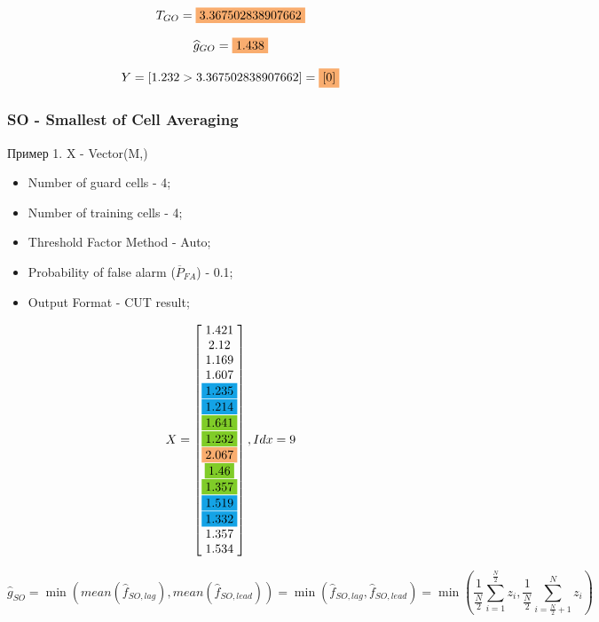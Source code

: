 \documentclass[a4paper,11pt]{article}
\begin{document}
			\begin{framed}
				
				$$ T_{GO} =  \colorbox{Apricot}{3.367502838907662}$$
				
				$$ \widehat{g}_{GO} =  \colorbox{Apricot}{1.438}$$ 
				
				$$ Y = [1.232 > 3.367502838907662] = \colorbox{Apricot}{[0]}$$
			\end{framed}
			
			
		\subsubsection{SO - Smallest of Cell Averaging}
			Пример 1. X - Vector(M,)
			
			\begin{itemize}
				\item Number of guard cells - 4; 
				\item Number of training cells - 4;
				\item Threshold Factor Method - Auto;
				\item Probability of false alarm ($\overline{P}_{FA}$) - 0.1;
				\item Output Format - CUT result;
			\end{itemize}
			
			$$X = 
			\begin{bmatrix}
				1.421\\
				2.12\\
				1.169\\
				1.607\\
				\colorbox{Cerulean}{1.235}\\
				\colorbox{Cerulean}{1.214}\\
				\colorbox{LimeGreen}{1.641}\\
				\colorbox{LimeGreen}{1.232}\\
				\colorbox{Apricot}{2.067}\\
				\colorbox{LimeGreen}{1.46}\\
				\colorbox{LimeGreen}{1.357}\\
				\colorbox{Cerulean}{1.519}\\
				\colorbox{Cerulean}{1.332}\\
				1.357\\
				1.534
			\end{bmatrix}, Idx = 9
			$$
			
			$$ \widehat{g}_{SO} = \min(mean(\widehat{f}_{SO,lag}), mean(\widehat{f}_{SO,lead})) =\min(\widehat{f}_{SO,lag}, \widehat{f}_{SO,lead}) = \min\left(\frac{1}{\frac{N}{2}}\sum_{i = 1}^{\frac{N}{2}}z_{i},\frac{1}{\frac{N}{2}}\sum_{i = \frac{N}{2} + 1}^{N}z_{i}\right)$$
			
\end{document}
